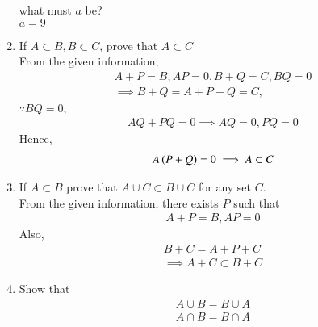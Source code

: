 \begin{enumerate}[label=\arabic*.,ref=\thesubsection.\theenumi]
	what must $a$ be?
		\\
		\solution $a = 9$
	\item If $A \subset B, B \subset C$, prove that $A \subset C$
		\\
		\solution From the given information, 
		\begin{align}
A+P = B, AP = 0, B + Q = C, B Q = 0
\\
\implies 
	B+Q = A+P+Q =C,
		\end{align}
		$\because BQ = 0$, 
		\begin{align}
			AQ + PQ = 0 \implies AQ = 0, PQ = 0
		\end{align}
		Hence, 
		\begin{align}
			A\left(P+Q\right) = 0 \implies A \subset C
		\end{align}
	\item If $A \subset B$ prove that $ A \cup C \subset B \cup C$ for any set $C$.
		\\
		\solution From the given information, there exists $P$ such that
		\begin{align}
			A+P = B, AP = 0
		\end{align}
		Also, 
		\begin{align}
			B+C = A+P+C
			\\
			\implies A+C \subset B+C
		\end{align}
	\item Show that 
		\begin{align}
			A \cup B = B \cup A
			\\
			A \cap B = B \cap A
		\end{align}


\end{enumerate}
